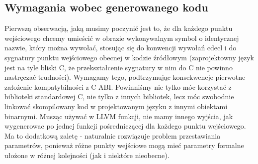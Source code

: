 \subsection{Wymagania wobec generowanego kodu}
Pierwszą obserwacją, jaką musimy poczynić jest to, że dla każdego punktu wejściowego chcemy umieścić w obrazie wykonywalnym symbol o identycznej nazwie, który można wywołać, stosując się do konwencji wywołań cdecl i do sygnatury punktu wejściowego obecnej w kodzie źródłowym (zaprojektowny język jest na tyle bliski C, że przekształcenie sygnatury w nim do C nie powinno nastręczać trudności). Wymagamy tego, podtrzymując konsekwencje pierwotne założenie kompatybilności z C ABI. Powinniśmy nie tylko móc korzystać z biblioteki standardowej C, nie tylko z innych bibliotek, lecz móc swobodnie linkować skompilowany kod w projektowanym języku z innymi obiektami binarnymi. Musząc używać w LLVM funkcji, nie mamy innego wyjścia, jak wygenerowac po jednej funkcji pośredniczącej dla każdego punktu wejściowego. Ma to dodatkową zaletę - naturalnie rozwiązuje problem przestawiania parametrów, ponieważ różne punkty wejściowe mogą mieć parametry formalne ułożone w różnej kolejności (jak i niektóre nieobecne).


